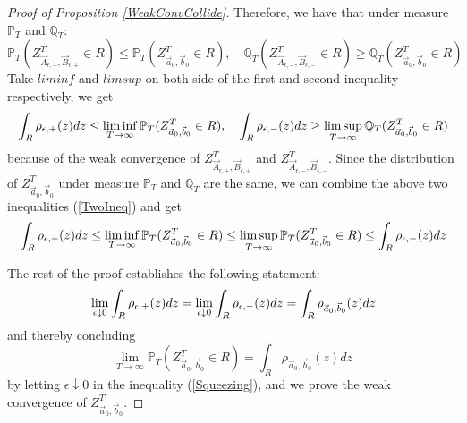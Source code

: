 \begin{proof}[Proof of Proposition \ref{WeakConvCollide}]
Therefore, we have that under measure $\mathbb{P}_{T}$ and $\mathbb{Q}_{T}$:
$$\mathbb{P}_{T}(Z^{T}_{\vec{A}_{\epsilon,+},\vec{B}_{\epsilon,+}}\in R)\leq \mathbb{P}_{T}(Z^{T}_{\vec{a}_{0},\vec{b}_{0}}\in R),\quad \mathbb{Q}_{T}(Z^{T}_{\vec{A}_{\epsilon,-},\vec{B}_{\epsilon,-}}\in R)\geq \mathbb{Q}_{T}(Z^{T}_{\vec{a}_{0},\vec{b}_{0}}\in R)$$
Take $liminf$ and $limsup$ on both side of the first and second inequality respectively, we get
\begin{align}{\label{TwoIneq}}
\int_{R}\rho_{\epsilon,+}(z)dz\leq \liminf_{T\rightarrow\infty}\mathbb{P}_{T}(Z^{T}_{\vec{a}_{0},\vec{b}_{0}}\in R),\quad \int_{R}\rho_{\epsilon,-}(z)dz\geq \limsup_{T\rightarrow\infty}\mathbb{Q}_{T}(Z^{T}_{\vec{a}_{0},\vec{b}_{0}}\in R)
\end{align}
because of the weak convergence of $Z^{T}_{\vec{A}_{\epsilon,+},\vec{B}_{\epsilon,+}}$ and $Z^{T}_{\vec{A}_{\epsilon,-},\vec{B}_{\epsilon,-}}$. Since the distribution of $Z^{T}_{\vec{a}_{0},\vec{b}_{0}}$ under measure $\mathbb{P}_{T}$ and $\mathbb{Q}_{T}$ are the same, we can combine the above two inequalities (\ref{TwoIneq}) and get
\begin{align}{\label{Squeezing}}
\int_{R}\rho_{\epsilon,+}(z)dz\leq \liminf_{T\rightarrow\infty}\mathbb{P}_{T}(Z^{T}_{\vec{a}_{0},\vec{b}_{0}}\in R)\leq\limsup_{T\rightarrow\infty}\mathbb{P}_{T}(Z^{T}_{\vec{a}_{0},\vec{b}_{0}}\in R)\leq\int_{R}\rho_{\epsilon,-}(z)dz	
\end{align}

The rest of the proof establishes the following statement:
\begin{align}{\label{WeakConvConclude}}
\lim_{\epsilon\downarrow 0}\int_{R}\rho_{\epsilon,+}(z)dz=\lim_{\epsilon\downarrow 0}\int_{R}\rho_{\epsilon,-}(z)dz=\int_{R}\rho_{\vec{a}_{0},\vec{b}_{0}}(z)dz
\end{align}
and thereby concluding $$\lim_{T\rightarrow\infty}\mathbb{P}_{T}(Z^{T}_{\vec{a}_{0},\vec{b}_{0}}\in R)=\int_{R}\rho_{\vec{a}_{0},\vec{b}_{0}}(z)dz$$ by letting $\epsilon\downarrow 0$ in the inequality (\ref{Squeezing}), and we prove the weak convergence of $Z^{T}_{\vec{a}_{0},\vec{b}_{0}}$.


\end{proof}
